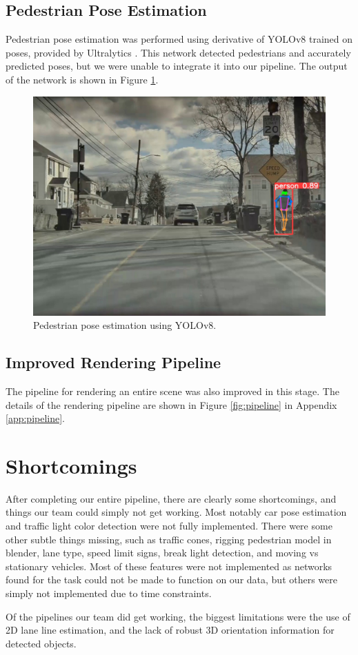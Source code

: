 \subsection{Pedestrian Pose Estimation}
Pedestrian pose estimation was performed using derivative of YOLOv8 trained on poses, provided by Ultralytics \cite{YOLOv8Pose}. This network detected pedestrians and accurately predicted poses, but we were unable to integrate it into our pipeline. The output of the network is shown in Figure \ref{fig:pedestrian_pose}.

\begin{figure}
  \centering
  \includegraphics[width=0.95\linewidth]{images/pedestrian_pose.jpg}
  \caption{Pedestrian pose estimation using YOLOv8.}
  \label{fig:pedestrian_pose}
\end{figure}

\subsection{Improved Rendering Pipeline}
The pipeline for rendering an entire scene was also improved in this stage. The details of the rendering pipeline are shown in Figure \ref{fig:pipeline} in Appendix \ref{app:pipeline}.

\section{Shortcomings}
After completing our entire pipeline, there are clearly some shortcomings, and things our team could simply not get working. Most notably car pose estimation and traffic light color detection were not fully implemented. There were some other subtle things missing, such as traffic cones, rigging pedestrian model in blender, lane type, speed limit signs, break light detection, and moving vs stationary vehicles. Most of these features were not implemented as networks found for the task could not be made to function on our data, but others were simply not implemented due to time constraints.

Of the pipelines our team did get working, the biggest limitations were the use of 2D lane line estimation, and the lack of robust 3D orientation information for detected objects.